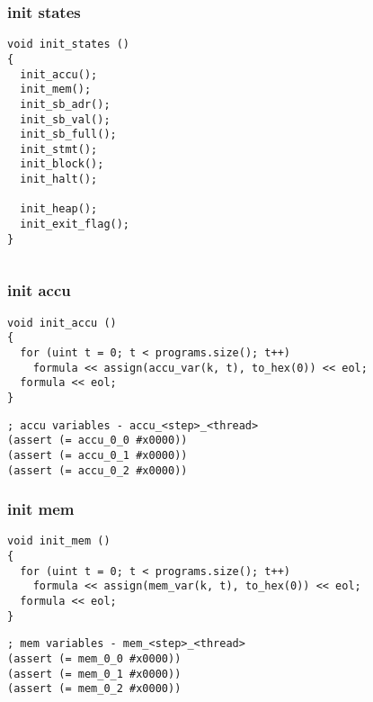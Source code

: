 \subsubsection{init states}

\begin{lstlisting}[style=c++]
void init_states ()
{
  init_accu();
  init_mem();
  init_sb_adr();
  init_sb_val();
  init_sb_full();
  init_stmt();
  init_block();
  init_halt();

  init_heap();
  init_exit_flag();
}
\end{lstlisting}

\begin{lstlisting}[language=SMTLib]
\end{lstlisting}

\subsubsection{init accu}

\begin{lstlisting}[style=c++]
void init_accu ()
{
  for (uint t = 0; t < programs.size(); t++)
    formula << assign(accu_var(k, t), to_hex(0)) << eol;
  formula << eol;
}
\end{lstlisting}

\begin{lstlisting}[language=SMTLib]
; accu variables - accu_<step>_<thread>
(assert (= accu_0_0 #x0000))
(assert (= accu_0_1 #x0000))
(assert (= accu_0_2 #x0000))
\end{lstlisting}

\subsubsection{init mem}

\begin{lstlisting}[style=c++]
void init_mem ()
{
  for (uint t = 0; t < programs.size(); t++)
    formula << assign(mem_var(k, t), to_hex(0)) << eol;
  formula << eol;
}
\end{lstlisting}

\begin{lstlisting}[language=SMTLib]
; mem variables - mem_<step>_<thread>
(assert (= mem_0_0 #x0000))
(assert (= mem_0_1 #x0000))
(assert (= mem_0_2 #x0000))
\end{lstlisting}

